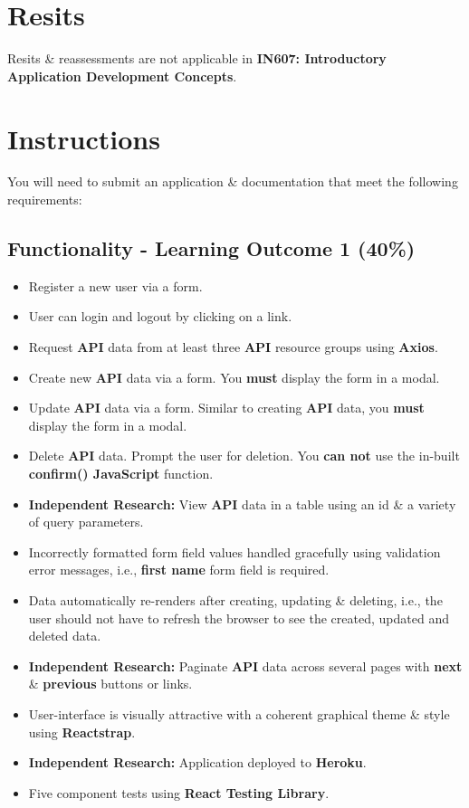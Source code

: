 \documentclass{article}
\begin{document}
\section*{Resits}
Resits \& reassessments are not applicable in \textbf{IN607: Introductory Application Development Concepts}. 

\newpage

\section*{Instructions}
You will need to submit an application \& documentation that meet the following requirements:

\subsection*{Functionality - Learning Outcome 1 (40\%)}
\begin{itemize}
        \item Register a new user via a form.
        \item User can login and logout by clicking on a link. 
        \item Request \textbf{API} data from at least three \textbf{API} resource groups using \textbf{Axios}.
        \item Create new \textbf{API} data via a form. You \textbf{must} display the form in a modal. 
        \item Update \textbf{API} data via a form. Similar to creating \textbf{API} data, you \textbf{must} display the form in a modal. 
        \item Delete \textbf{API} data. Prompt the user for deletion. You \textbf{can not} use the in-built \textbf{confirm() JavaScript} function. 
        \item \textbf{Independent Research:} View \textbf{API} data in a table using an id \& a variety of query parameters. 
        \item Incorrectly formatted form field values handled gracefully using validation error messages, i.e., \textbf{first name} form field is required.
        \item Data automatically re-renders after creating, updating \& deleting, i.e., the user should not have to refresh the browser to see the created, updated and deleted data.
        \item \textbf{Independent Research:} Paginate \textbf{API} data across several pages with \textbf{next} \& \textbf{previous} buttons or links.
        \item User-interface is visually attractive with a coherent graphical theme \& style using \textbf{Reactstrap}.
        \item \textbf{Independent Research:} Application deployed to \textbf{Heroku}. 
        \item Five component tests using \textbf{React Testing Library}.
\end{itemize}
\end{document}
